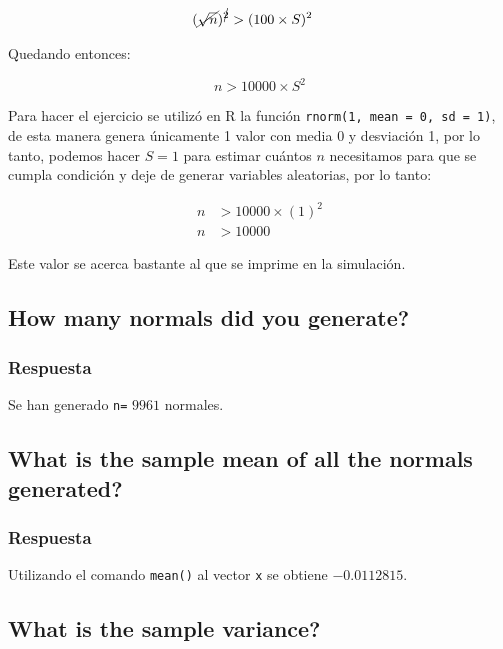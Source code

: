\documentclass[12pt]{article}\usepackage[]{graphicx}\usepackage[]{xcolor}
\begin{document}
\begin{align*}
  (\cancel{\sqrt{n}})^{\cancel{2}} &> (100 \times S)^{2} 
\end{align*}

Quedando entonces:

\[
n > 10000\times S^{2}
\]

Para hacer el ejercicio se utilizó en \textsf{R} la función \texttt{rnorm(1, mean = 0, sd = 1)}, de esta manera genera únicamente 1 valor con media 0 y desviación 1, por lo tanto, podemos hacer $S = 1$ para estimar cuántos $n$ necesitamos para que se cumpla condición y deje de generar variables aleatorias, por lo tanto:

\begin{align*}
  n &> 10000 \times (1)^{2} \\
  n &> 10000 
\end{align*}

Este valor se acerca bastante al que se imprime en la simulación. 











\subsection{How many normals did you generate?}
\label{subsec:p1-b}

\subsubsection{Respuesta}

Se han generado \lstinline|n=| $9961$ normales.


\subsection{What is the sample mean of all the normals generated?}
\label{subsec:p1-c}




\subsubsection{Respuesta}

Utilizando el comando \lstinline|mean()| al vector \lstinline|x| se obtiene $-0.0112815$. 

\subsection{What is the sample variance?}
\label{subsec:p1-d}
\end{document}
